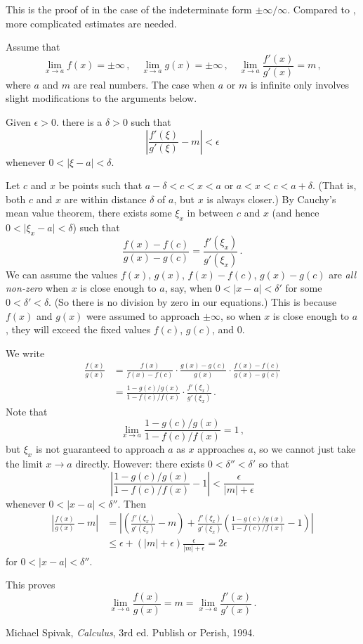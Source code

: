 \documentclass[12pt]{article}
\providecommand{\abs}[1]{\lvert#1\rvert}
\providecommand{\absW}[1]{\left\lvert#1\right\rvert}
\begin{document}
This is the proof of 
in the case of the indeterminate form $\pm \infty / \infty$.
Compared to ,
more complicated estimates are needed.

Assume that
\[
\lim_{x \to a} f(x) = \pm \infty \,, \quad \lim_{x \to a} g(x) = \pm \infty\,, \quad
\lim_{x \to a} \frac{f'(x)}{g'(x)} = m\,, 
\]
where $a$ and $m$ are real numbers. 
The case when $a$ or $m$ is infinite only involves
slight modifications to the arguments below.

Given $\epsilon > 0$.
there is a $\delta > 0$ such that 
\[
\absW{ \frac{f'(\xi)}{g'(\xi)}  - m} < \epsilon
\]
whenever $0 < \abs{\xi - a} < \delta$.

Let $c$ and $x$ be points such that
$a-\delta < c < x < a$ or $a < x < c < a+\delta$.
(That is, both $c$ and $x$ are within distance $\delta$ of $a$,
but $x$ is always closer.)
By Cauchy's mean value theorem, there exists some $\xi_x$ 
in between $c$ and $x$ (and hence $0 < \abs{\xi_x -a} < \delta$)
such that
\[
\frac{f(x) - f(c)}{g(x) - g(c)} = \frac{f'(\xi_x)}{g'(\xi_x)}\,.
\]
We can assume the values $f(x)$, $g(x)$, $f(x) - f(c)$, $g(x) - g(c)$
are \emph{all non-zero} when $x$ is close enough to $a$,
say, when $0 < \abs{x - a} < \delta'$ for some $0 < \delta' < \delta$.
(So there is no division by zero in our equations.)
This is because $f(x)$ and $g(x)$ were assumed to approach $\pm \infty$,
so when $x$ is close enough to $a$, 
they will exceed the fixed values $f(c)$, $g(c)$, and $0$.

We write
\begin{align*}
\frac{f(x)}{g(x)} &=
\frac{f(x)}{f(x)-f(c)} \cdot
\frac{g(x)-g(c)}{g(x)} \cdot
\frac{f(x)-f(c)}{g(x)-g(c)}  \\
&= 
\frac{1-g(c)/g(x)}{1-f(c)/f(x)}
\cdot \frac{f'(\xi_x)}{g'(\xi_x)}\,.
\end{align*}
Note that
\[
\lim_{x \to a} \frac{1-g(c)/g(x)}{1-f(c)/f(x)} = 1\,,
\]
but $\xi_x$ is not guaranteed to approach $a$ as $x$ approaches $a$,
so we cannot just take the limit $x \to a$ directly.  However:
there exists $0 < \delta'' < \delta'$ so that
\[
\absW{ \frac{1-g(c)/g(x)}{1-f(c)/f(x)}  - 1} < 
\frac{\epsilon}{\abs{m} + \epsilon}
\]
whenever $0 < \abs{x - a} < \delta''$.  
Then
\begin{align*}
\absW{\frac{f(x)}{g(x)} - m }
&= \absW{\left( \frac{f'(\xi_x)}{g'(\xi_x)} -  m\right) + \frac{f'(\xi_x)}{g'(\xi_x)}  \left( \frac{1-g(c)/g(x)}{1-f(c)/f(x) } - 1 \right) }
\\
&\leq \epsilon + (\abs{m} + \epsilon) \frac{\epsilon}{\abs{m}+\epsilon}
= 2\epsilon
\end{align*}
for $0 < \abs{x-a} < \delta''$.

This proves
\[
\lim_{x \to a} \frac{f(x)}{g(x)} = m
=
\lim_{x \to a} \frac{f'(x)}{g'(x)}\,.
\]

\begin{thebibliography}{XXXXXX}
Michael Spivak, \emph{Calculus}, 3rd ed. Publish or Perish, 1994.
\end{thebibliography}
\end{document}
